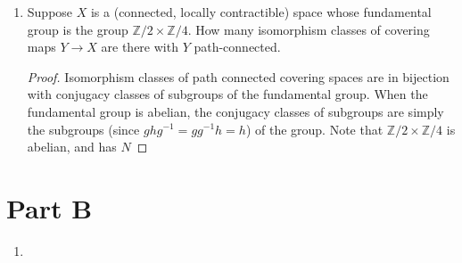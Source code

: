 \documentclass{article}
\begin{document}
\begin{enumerate}
\begin{proof}{(From \href{https://math.stackexchange.com/questions/202447/retraction-of-the-m\%C3\%B6bius-strip-to-its-boundary}{StackExchange})}
	If there were a retraction $r: M \rightarrow \partial M$, then the induced homomorphism $r_*$ on fundamental groups would satisfy $r_*\circ \iota_* (\alpha) = \alpha$. But $\iota_*(\alpha) = \beta^2$, so then $r_*(\beta^2) = r_*(\beta)^2 = \alpha$, or $r_*(\beta) = \sqrt{\alpha} \not \in \pi_1(\partial M)$.
	\end{proof}
	
	\item Suppose $X$ is a (connected, locally contractible) space whose fundamental group is the group $\mathbb{Z}/2 \times \mathbb{Z}/4.$
	How many isomorphism classes of covering maps $Y \rightarrow X$ are there with $Y$ path-connected.
	
	\begin{proof}
		Isomorphism classes of path connected covering spaces are in bijection with conjugacy classes of subgroups of the fundamental group. 
		When the fundamental group is abelian, the conjugacy classes of subgroups are simply 
		the subgroups (since $ghg^{-1} = gg^{-1} h=h$) of the group. 
		Note that $\mathbb{Z}/2 \times \mathbb{Z}/4$ is abelian, and has $N$ %
		
	\end{proof}
\end{enumerate}

\section*{Part B}
\begin{enumerate}
	\item	 
\end{enumerate}
\end{document}
